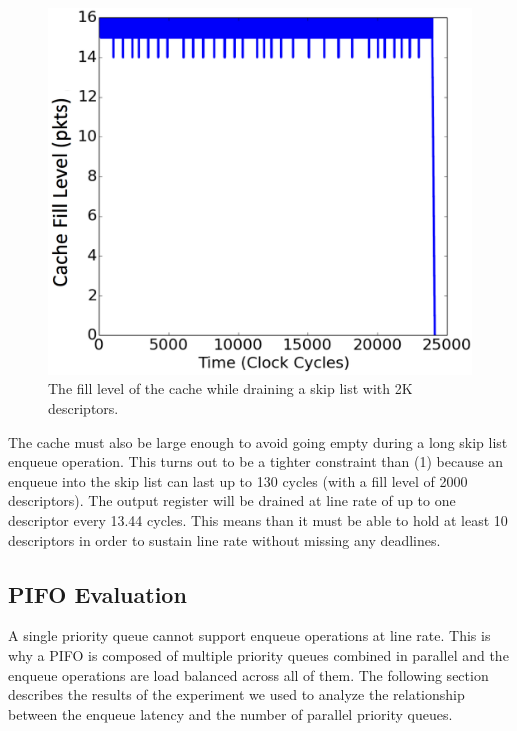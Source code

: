 \begin{figure}[!ht]
\includegraphics[width=1\linewidth]{figures/eval/cache_fill_plot}
\caption{The fill level of the cache while draining a skip list with 2K descriptors.}
\label{fig:cache_fill}
\end{figure}

The cache must also be large enough to avoid going empty during a long skip list enqueue operation. This turns out to be a tighter constraint than (1) because an enqueue into the skip list can last up to 130 cycles (with a fill level of 2000 descriptors). The output register will be drained at line rate of up to one descriptor every 13.44 cycles. This means than it must be able to hold at least 10 descriptors in order to sustain line rate without missing any deadlines.

\subsection{PIFO Evaluation}

A single priority queue cannot support enqueue operations at line rate. This is why a PIFO is composed of multiple priority queues combined in parallel and the enqueue operations are load balanced across all of them. The following section describes the results of the experiment we used to analyze the relationship between the enqueue latency and the number of parallel priority queues.

